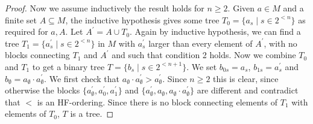 \documentclass[10pt,a4paper]{article}
\theoremstyle{note}
\begin{document}
\begin{proof}
	
	Now we assume inductively the result holds for $n\geq 2$.
	Given $a\in M$ and a finite set $A\subseteq M$, the inductive hypothesis gives some tree $T_0=\{a_s\mid s\in 2^{<n}\}$ as required for $a,A$.  Let $A^\prime =A\cup T_0$. Again by inductive hypothesis, we can find a tree $T_1=\{a^\prime_s\mid s\in 2^{<n}\}$ in $M$  with $a^\prime_s$ larger than every element of $A^\prime$, with no blocks connecting $T_1$ and $A^\prime$  and such that condition 2 holds. Now we combine $T_0$ and $T_1$ to get a binary tree $T=\{b_s \mid s\in 2^{<n+1}\}$. We set $b_{0s}= a_s$, $b_{1s}= a^\prime_s$  and  $b_\emptyset = a_\emptyset\cdot a^\prime_\emptyset$.  We first  check that   $a_\emptyset\cdot a^\prime_\emptyset > a^\prime_\emptyset$. Since $n\geq 2$ this is clear, since otherwise the blocks $\{a^\prime_\emptyset,a^\prime_0,a^\prime_1\}$  and  $\{a^\prime_\emptyset, a_\emptyset, a_\emptyset \cdot a^\prime_\emptyset\}$ are different and contradict that $<$ is an HF-ordering. Since there is no block connecting elements of $T_1$ with elements of $T_0$, $T$ is a tree.
\end{proof}
\end{document}
